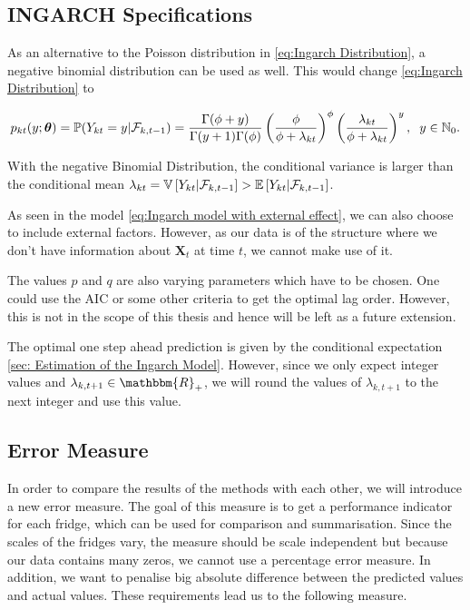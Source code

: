 \subsection{INGARCH Specifications}
\label{sec: Ingarch Specifications}

As an alternative to the Poisson distribution in \ref{eq:Ingarch Distribution}, a negative binomial distribution can be used as well. This would change \ref{eq:Ingarch Distribution} to 

\begin{equation}
p_{kt}(y;\bm{\theta})=\mathbb{P}(Y_{kt}=y | \mathcal{F}_{k,t-1}) = \frac{\Gamma(\phi+y)}{\Gamma(y+1)\Gamma(\phi)}\left(\frac{\phi}{\phi+\lambda_{kt}}\right)^\phi\left(\frac{\lambda_{kt}}{\phi+\lambda_{kt}}\right)^y, \hspace{0.2cm} y \in \mathbb{N}_0.
\label{eq:Ingarch negbinom Distribution}
\end{equation}

With the negative Binomial Distribution, the conditional variance is larger than the conditional mean $\lambda_{kt} = \mathbb{V}\left[Y_{kt} | \mathcal{F}_{k,t-1}\right] > \mathbb{E}\left[Y_{kt} | \mathcal{F}_{k,t-1}\right]$.

As seen in the model \ref{eq:Ingarch model with external effect}, we can also choose to include external factors. However, as our data is of the structure where we don't have information about $\bm{X}_t$ at time $t$, we cannot make use of it. 

The values $p$ and $q$ are also varying parameters which have to be chosen. One could use the AIC or some other criteria to get the optimal lag order. However, this is not in the scope of this thesis and hence will be left as a future extension.

The optimal one step ahead prediction is given by the conditional expectation \ref{sec: Estimation of the Ingarch Model}. However, since we only expect integer values and $\lambda_{k,t+1} \in \mathbbm{R}_+$, we will round the values of $\lambda_{k,t+1}$ to the next integer and use this value. 



\subsection{Error Measure}
\label{sec: Error Measure}

In order to compare the results of the methods with each other, we will introduce a new error measure. The goal of this measure is to get a performance indicator for each fridge, which can be used for comparison and summarisation. Since the scales of the fridges vary, the measure should be scale independent but because our data contains many zeros, we cannot use a percentage error measure. In addition, we want to penalise big absolute difference between the predicted values and actual values. These requirements lead us to the following measure.

